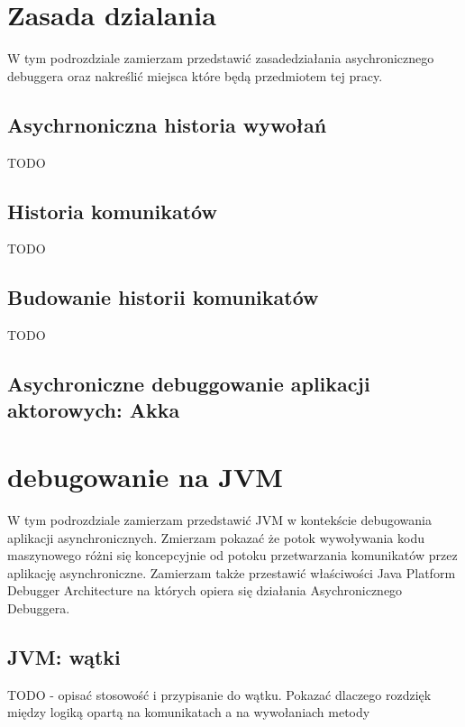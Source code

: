 


\section{Zasada dzialania}

W tym podrozdziale zamierzam przedstawić zasadedziałania asychronicznego debuggera oraz nakreślić  miejsca które będą przedmiotem tej pracy.

\subsection{Asychrnoniczna historia wywołań}
TODO
\subsection{Historia komunikatów}
TODO
\subsection{Budowanie historii komunikatów}

TODO

\subsection{Asychroniczne debuggowanie aplikacji aktorowych: Akka}

\section{debugowanie na JVM}

W tym podrozdziale zamierzam przedstawić JVM w kontekście debugowania aplikacji asynchronicznych. Zmierzam pokazać że potok wywoływania kodu maszynowego różni się koncepcyjnie od potoku przetwarzania komunikatów przez aplikację asynchroniczne. Zamierzam także przestawić właściwości Java Platform Debugger Architecture na których opiera się działania Asychronicznego Debuggera.

\subsection{JVM: wątki}

TODO - opisać stosowość i przypisanie do wątku. Pokazać dlaczego rozdzięk między logiką opartą na komunikatach a na wywołaniach metody

